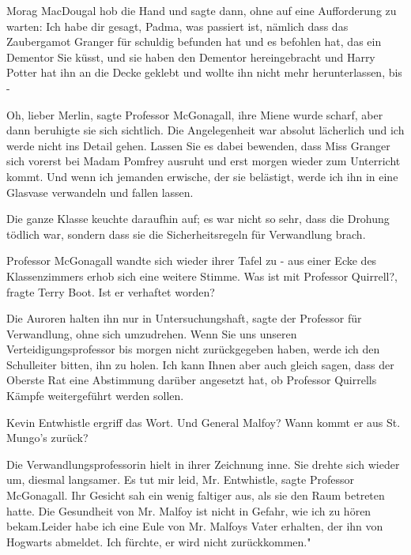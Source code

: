 Morag MacDougal hob die Hand und sagte dann, ohne auf eine Aufforderung zu
warten: \glqq Ich habe dir gesagt, Padma, was passiert ist, nämlich dass das
Zaubergamot Granger für schuldig befunden hat und es befohlen hat, das ein
Dementor Sie küsst, und sie haben den Dementor hereingebracht und Harry Potter
hat ihn an die Decke geklebt und wollte ihn nicht mehr herunterlassen, bis
-\grqq{}

\glqq Oh, lieber Merlin\grqq{}, sagte Professor McGonagall, ihre Miene wurde
scharf, aber dann beruhigte sie sich sichtlich. \glqq Die Angelegenheit war
absolut lächerlich und ich werde nicht ins Detail gehen. Lassen Sie es dabei
bewenden, dass Miss Granger sich vorerst bei Madam Pomfrey ausruht und erst
morgen wieder zum Unterricht kommt. Und wenn ich jemanden erwische, der sie
belästigt, werde ich ihn in eine Glasvase verwandeln und fallen lassen.\grqq{}

Die ganze Klasse keuchte daraufhin auf; es war nicht so sehr, dass die Drohung
tödlich war, sondern dass sie die Sicherheitsregeln für Verwandlung brach.

Professor McGonagall wandte sich wieder ihrer Tafel zu - aus einer Ecke des
Klassenzimmers erhob sich eine weitere Stimme. \glqq Was ist mit Professor
Quirrell?\grqq{}, fragte Terry Boot. \glqq Ist er verhaftet worden?\grqq{}

\glqq Die Auroren halten ihn nur in Untersuchungshaft\grqq{}, sagte der
Professor für Verwandlung, ohne sich umzudrehen. \glqq Wenn Sie uns unseren
Verteidigungsprofessor bis morgen nicht zurückgegeben haben, werde ich den
Schulleiter bitten, ihn zu holen. Ich kann Ihnen aber auch gleich sagen, dass
der Oberste Rat eine Abstimmung darüber angesetzt hat, ob Professor Quirrells
Kämpfe weitergeführt werden sollen.\grqq{}

Kevin Entwhistle ergriff das Wort. \glqq Und General Malfoy? Wann kommt er aus
St. Mungo's zurück?\grqq{}

Die Verwandlungsprofessorin hielt in ihrer Zeichnung inne. Sie drehte sich
wieder um, diesmal langsamer. \glqq Es tut mir leid, Mr. Entwhistle\grqq{},
sagte Professor McGonagall. Ihr Gesicht sah ein wenig faltiger aus, als sie den
Raum betreten hatte. \glqq Die Gesundheit von Mr. Malfoy ist nicht in Gefahr,
wie ich zu hören bekam.Leider habe ich eine Eule von Mr. Malfoys Vater erhalten,
der ihn von Hogwarts abmeldet. Ich fürchte, er wird nicht zurückkommen."

